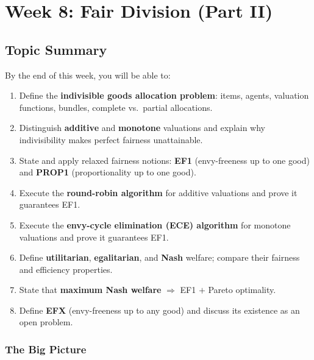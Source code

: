 \section{Week 8: Fair Division (Part II)}

\subsection{Topic Summary}

\begin{keybox}
By the end of this week, you will be able to:
\begin{enumerate}
  \item Define the \textbf{indivisible goods allocation problem}: items, agents, valuation functions, bundles, complete vs.\ partial allocations.
  \item Distinguish \textbf{additive} and \textbf{monotone} valuations and explain why indivisibility makes perfect fairness unattainable.
  \item State and apply relaxed fairness notions: \textbf{EF1} (envy-freeness up to one good) and \textbf{PROP1} (proportionality up to one good).
  \item Execute the \textbf{round-robin algorithm} for additive valuations and prove it guarantees EF1.
  \item Execute the \textbf{envy-cycle elimination (ECE) algorithm} for monotone valuations and prove it guarantees EF1.
  \item Define \textbf{utilitarian}, \textbf{egalitarian}, and \textbf{Nash} welfare; compare their fairness and efficiency properties.
  \item State that \textbf{maximum Nash welfare} $\Rightarrow$ EF1 $+$ Pareto optimality.
  \item Define \textbf{EFX} (envy-freeness up to any good) and discuss its existence as an open problem.
\end{enumerate}
\end{keybox}

\separator

\subsubsection*{The Big Picture}

